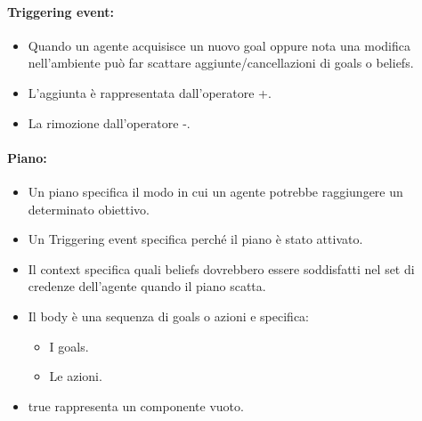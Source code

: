 



\paragraph{Triggering event:}

\begin{itemize}
  \item Quando un agente acquisisce un nuovo goal oppure nota una modifica nell'ambiente può far scattare aggiunte/cancellazioni di goals o beliefs. 
  \item L'aggiunta è rappresentata dall'operatore +. 
  \item La rimozione dall'operatore -.
\end{itemize}


\paragraph{Piano:}

\begin{itemize}
  \item Un piano specifica il modo in cui un agente potrebbe raggiungere un determinato obiettivo. 
  \item Un Triggering event specifica perché il piano è stato attivato. 
  \item Il context specifica quali beliefs dovrebbero essere soddisfatti nel set di credenze dell'agente quando il piano scatta. 
  \item Il body è una sequenza di goals o azioni e specifica:
    \begin{itemize}
      \item I goals. 
      \item Le azioni.
    \end{itemize}
  \item true rappresenta un componente vuoto.
\end{itemize} 











